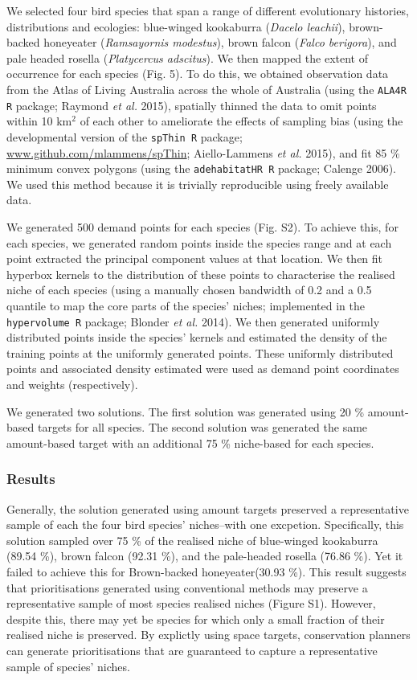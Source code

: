 \documentclass[11pt,]{article}
\begin{document}
We selected four bird species that span a range of different
evolutionary histories, distributions and ecologies: blue-winged
kookaburra (\emph{Dacelo leachii}), brown-backed honeyeater
(\emph{Ramsayornis modestus}), brown falcon (\emph{Falco berigora}), and
pale headed rosella (\emph{Platycercus adscitus}). We then mapped the
extent of occurrence for each species (Fig. 5). To do this, we obtained
observation data from the Atlas of Living Australia across the whole of
Australia (using the \texttt{ALA4R R} package; Raymond \emph{et al.}
2015), spatially thinned the data to omit points within 10 km$^2$ of
each other to ameliorate the effects of sampling bias (using the
developmental version of the \texttt{spThin R} package;
\url{www.github.com/mlammens/spThin}; Aiello-Lammens \emph{et al.}
2015), and fit 85 \% minimum convex polygons (using the
\texttt{adehabitatHR R} package; Calenge 2006). We used this method
because it is trivially reproducible using freely available data.

We generated 500 demand points for each species (Fig. S2). To achieve
this, for each species, we generated random points inside the species
range and at each point extracted the principal component values at that
location. We then fit hyperbox kernels to the distribution of these
points to characterise the realised niche of each species (using a
manually chosen bandwidth of 0.2 and a 0.5 quantile to map the core
parts of the species' niches; implemented in the \texttt{hypervolume R}
package; Blonder \emph{et al.} 2014). We then generated uniformly
distributed points inside the species' kernels and estimated the density
of the training points at the uniformly generated points. These
uniformly distributed points and associated density estimated were used
as demand point coordinates and weights (respectively).

We generated two solutions. The first solution was generated using 20 \%
amount-based targets for all species. The second solution was generated
the same amount-based target with an additional 75 \% niche-based for
each species.

\subsubsection{Results}\label{results-1}

Generally, the solution generated using amount targets preserved a
representative sample of each the four bird species' niches--with one
excpetion. Specifically, this solution sampled over 75 \% of the
realised niche of blue-winged kookaburra (89.54 \%), brown falcon (92.31
\%), and the pale-headed rosella (76.86 \%). Yet it failed to achieve
this for Brown-backed honeyeater(30.93 \%). This result suggests that
prioritisations generated using conventional methods may preserve a
representative sample of most species realised niches (Figure S1).
However, despite this, there may yet be species for which only a small
fraction of their realised niche is preserved. By explictly using space
targets, conservation planners can generate prioritisations that are
guaranteed to capture a representative sample of species' niches.
\end{document}
